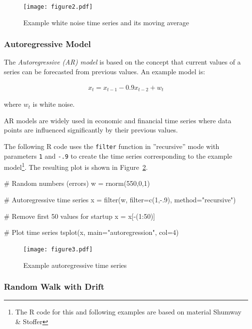 \begin{figure}
\centering

\texttt{[image: figure2.pdf]}
\caption{Example white noise time series and its moving average}
\label{fig:figure2}
\end{figure}

\subsubsection*{Autoregressive Model}

The \emph{Autoregressive (AR) model} is based on the concept that current values of a series can be forecasted from previous values. An example model is:

\begin{align*}x_t = x_{t-1} - 0.9 x_{t-2} + w_t\end{align*}


\noindent where $w_t$ is white noise.

AR models are widely used in economic and financial time series where data points are influenced significantly by their previous values.

The following R code uses the \texttt{filter} function in ''recursive'' mode with parameters \texttt{1} and \texttt{-.9} to create the time series corresponding to the example model\footnote{The R code for this and following examples are based on material Shumway \& Stoffer}. The resulting plot is shown in Figure~\ref{fig:figure3}.

\begin{samepage}
\begin{Rcode}
# Random numbers (errors)
w = rnorm(550,0,1)

# Autoregressive time series
x = filter(w, filter=c(1,-.9), method="recursive")

# Remove first 50 values for startup
x = x[-(1:50)]

# Plot time series
tsplot(x, main="autoregression", col=4)
\end{Rcode}
\end{samepage}

\begin{figure}
\centering

\texttt{[image: figure3.pdf]}
\caption{Example autoregressive time series}
\label{fig:figure3}
\end{figure}

\subsubsection*{Random Walk with Drift}

